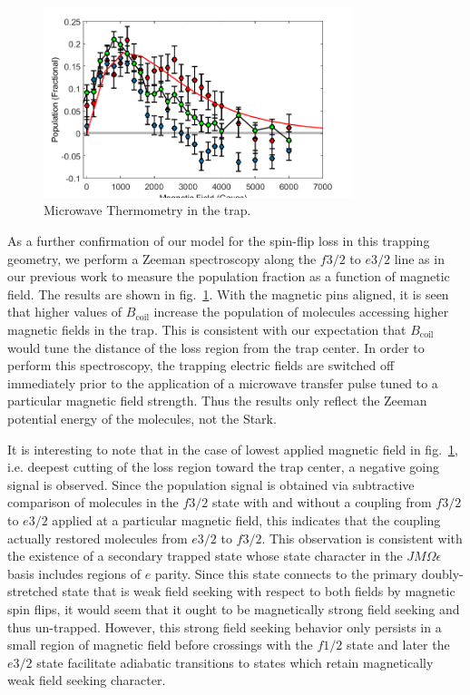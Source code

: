 \documentclass[%
 reprint,
 amsmath,amssymb,
 aps,
prl,
]{revtex4-1}
\begin{document}
\begin{figure}
\includegraphics[width=90mm]{MW-thermometry.png}%
\caption{
Microwave Thermometry in the trap.
\label{fig:spec}}
\end{figure}

As a further confirmation of our model for the spin-flip loss in this trapping geometry, we perform a Zeeman spectroscopy along the $f 3/2$ to $e 3/2$ line as in our previous work \cite{?} to measure the population fraction as a function of magnetic field. The results are shown in fig.~\ref{fig:spec}. With the magnetic pins aligned, it is seen that higher values of $B_{\text{coil}}$ increase the population of molecules accessing higher magnetic fields in the trap. This is consistent with our expectation that $B_\text{coil}$ would tune the distance of the loss region from the trap center. In order to perform this spectroscopy, the trapping electric fields are switched off immediately prior to the application of a microwave transfer pulse tuned to a particular magnetic field strength. Thus the results only reflect the Zeeman potential energy of the molecules, not the Stark. 

It is interesting to note that in the case of lowest applied magnetic field in fig.~\ref{fig:spec}, i.e. deepest cutting of the loss region toward the trap center, a negative going signal is observed. Since the population signal is obtained via subtractive comparison of molecules in the $f 3/2$ state with and without a coupling from $f 3/2$ to $e 3/2$ applied at a particular magnetic field, this indicates that the coupling actually restored molecules from $e 3/2$ to $f 3/2$. This observation is consistent with the existence of a secondary trapped state whose state character in the $JM\Omega\epsilon$ basis includes regions of $e$ parity. Since this state connects to the primary doubly-stretched state that is weak field seeking with respect to both fields by magnetic spin flips, it would seem that it ought to be magnetically strong field seeking and thus un-trapped. However, this strong field seeking behavior only persists in a small region of magnetic field before crossings with the $f 1/2$ state and later the $e 3/2$ state facilitate adiabatic transitions to states which retain magnetically weak field seeking character. 
\end{document}
